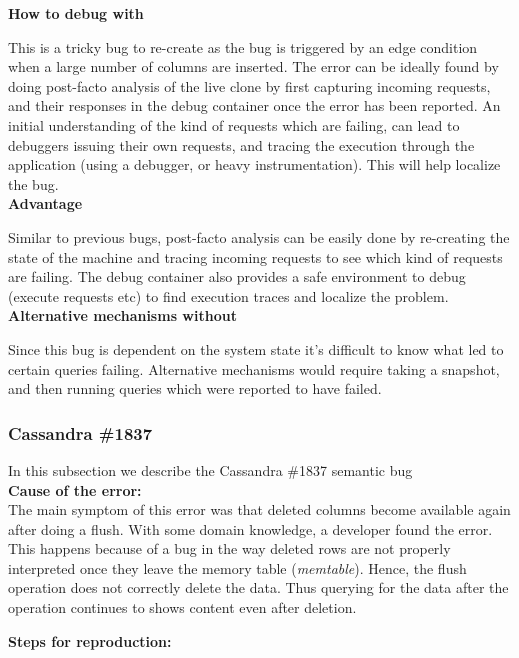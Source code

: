 \noindent \textbf{How to debug with \parikshan}

This is a tricky bug to re-create as the bug is triggered by an edge condition when a large number of columns are inserted. The error can be ideally found by doing post-facto analysis of the live clone by first capturing incoming requests, and their responses in the debug container once the error has been reported. An initial understanding of the kind of requests which are failing, can lead to debuggers issuing their own requests, and tracing the execution through the application (using a debugger, or heavy instrumentation). This will help localize the bug.\\

\noindent \textbf{Advantage}

Similar to previous bugs, post-facto analysis can be easily done by re-creating the state of the machine and tracing incoming requests to see which kind of requests are failing. The debug container also provides a safe environment to debug (execute requests etc) to find execution traces and localize the problem.\\

\noindent \textbf{Alternative mechanisms without \parikshan}

Since this bug is dependent on the system state it's difficult to know what led to certain queries failing. 
Alternative mechanisms would require taking a snapshot, and then running queries which were reported to have failed. 

\subsubsection{Cassandra \#1837}

In this subsection we describe the Cassandra \#1837 semantic bug \\

\noindent \textbf{Cause of the error:} \\

The main symptom of this error was that deleted columns become available again after doing a flush.
With some domain knowledge, a developer found the error. 
This happens because of a bug in the way deleted rows are not properly interpreted once they leave the memory table (\emph{memtable}). 
Hence, the flush operation does not correctly delete the data. 
Thus querying for the data after the operation continues to shows content even after deletion.

\noindent \textbf{Steps for reproduction:} \\


